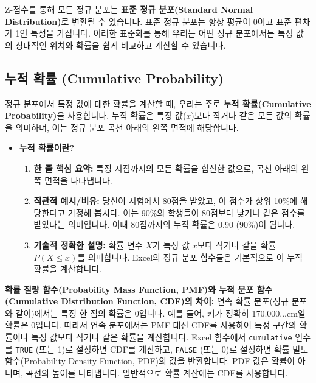 \documentclass[11pt,a4paper]{article}
\theoremstyle{definition}
\begin{document}
Z-점수를 통해 모든 정규 분포는 \textbf{표준 정규 분포(Standard Normal Distribution)}로 변환될 수 있습니다.
표준 정규 분포는 항상 평균이 0이고 표준 편차가 1인 특성을 가집니다.
이러한 표준화를 통해 우리는 어떤 정규 분포에서든 특정 값의 상대적인 위치와 확률을 쉽게 비교하고 계산할 수 있습니다.

\subsection{누적 확률 (Cumulative Probability)}
정규 분포에서 특정 값에 대한 확률을 계산할 때, 우리는 주로 \textbf{누적 확률(Cumulative Probability)}을 사용합니다.
누적 확률은 특정 값($x$)보다 작거나 같은 모든 값의 확률을 의미하며, 이는 정규 분포 곡선 아래의 왼쪽 면적에 해당합니다.

\begin{itemize}
    \item \textbf{누적 확률이란?}
    \begin{enumerate}
        \item \textbf{한 줄 핵심 요약:} 특정 지점까지의 모든 확률을 합산한 값으로, 곡선 아래의 왼쪽 면적을 나타냅니다.
        \item \textbf{직관적 예시/비유:} 당신이 시험에서 80점을 받았고, 이 점수가 상위 10\%에 해당한다고 가정해 봅시다. 이는 90\%의 학생들이 80점보다 낮거나 같은 점수를 받았다는 의미입니다. 이때 80점까지의 누적 확률은 0.90 (90\%)이 됩니다.
        \item \textbf{기술적 정확한 설명:} 확률 변수 $X$가 특정 값 $x$보다 작거나 같을 확률 $P(X \le x)$를 의미합니다. Excel의 정규 분포 함수들은 기본적으로 이 누적 확률을 계산합니다.
    \end{enumerate}
\end{itemize}

\begin{cautionbox}
    \textbf{확률 질량 함수(Probability Mass Function, PMF)와 누적 분포 함수(Cumulative Distribution Function, CDF)의 차이:}
    연속 확률 분포(정규 분포와 같이)에서는 특정 한 점의 확률은 0입니다. 예를 들어, 키가 정확히 170.000...cm일 확률은 0입니다. 따라서 연속 분포에서는 PMF 대신 CDF를 사용하여 특정 구간의 확률이나 특정 값보다 작거나 같은 확률을 계산합니다. Excel 함수에서 \texttt{cumulative} 인수를 \texttt{TRUE} (또는 1)로 설정하면 CDF를 계산하고, \texttt{FALSE} (또는 0)로 설정하면 확률 밀도 함수(Probability Density Function, PDF)의 값을 반환합니다. PDF 값은 확률이 아니며, 곡선의 높이를 나타냅니다. 일반적으로 확률 계산에는 CDF를 사용합니다.
\end{cautionbox}
\end{document}
